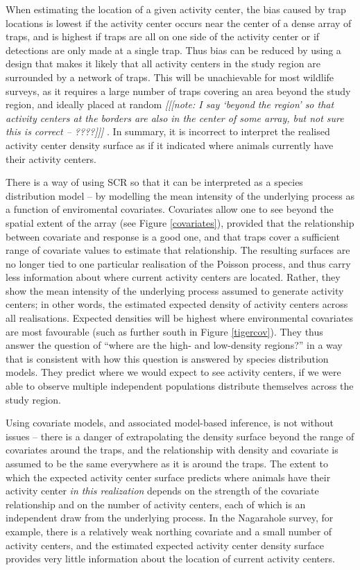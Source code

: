 \documentclass[10pt,a4paper]{article}
\begin{document}
When estimating the location of a given activity center, the bias caused by trap locations is lowest if the activity center occurs near the center of a dense array of traps, and is highest if traps are all on one side of the activity center or if detections are only made at a single trap. Thus bias can be reduced by using a design that makes it likely that all activity centers in the study region are surrounded by a network of traps. This will be unachievable for most wildlife surveys, as it requires a large number of traps covering an area beyond the study region, and ideally placed at random {\it [[[note: I say `beyond the region' so that activity centers at the borders are also in the center of some array, but not sure this is correct -- ????]]]} . In summary, it is incorrect to interpret the realised activity center density surface as if it indicated where animals currently have their activity centers. 

There is a way of using SCR so that it can be interpreted as a species distribution model -- by modelling the mean intensity of the underlying process as a function of enviromental covariates. Covariates allow one to see beyond the spatial extent of the array (see Figure \ref{covariates}), provided that the relationship between covariate and response is a good one, and that traps cover a sufficient range of covariate values to estimate that relationship. The resulting surfaces are no longer tied to one particular realisation of the Poisson process, and thus carry less information about where current activity centers are located. Rather, they show the mean intensity of the underlying process assumed to generate activity centers; in other words, the estimated expected density of activity centers across all realisations. Expected densities will be highest where environmental covariates are most favourable (such as further south in Figure \ref{tigercov}). They thus answer the question of ``where are the high- and low-density regions?'' in a way that is consistent with how this question is answered by species distribution models. They predict where we would expect to see activity centers, if we were able to observe multiple independent populations distribute themselves across the study region. 

Using covariate models, and associated model-based inference, is not without issues -- there is a danger of extrapolating the density surface beyond the range of covariates around the traps, and the relationship with density and covariate is assumed to be the same everywhere as it is around the traps. The extent to which the expected activity center surface predicts where animals have their activity center {\it in this realization} depends on the strength of the covariate relationship and on the number of activity centers, each of which is an independent draw from the underlying process. In the Nagarahole survey, for example, there is a relatively weak northing covariate and a small number of activity centers, and the estimated expected activity center density surface provides very little information about the location of current activity centers. 
\end{document}
